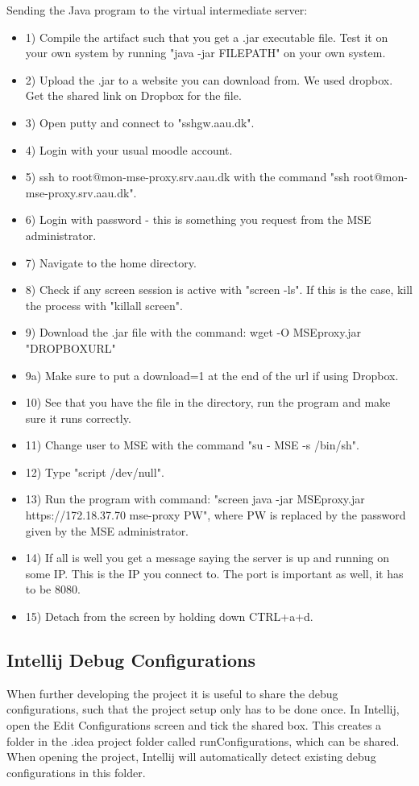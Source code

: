 Sending the Java program to the virtual intermediate server:
\begin{itemize}
\item 1) Compile the artifact such that you get a .jar executable file. Test it on your own system by running "java -jar FILEPATH" on your own system.
\item 2) Upload the .jar to a website you can download from. We used dropbox. Get the shared link on Dropbox for the file.
\item 3) Open putty and connect to "sshgw.aau.dk".
\item 4) Login with your usual moodle account.
\item 5) ssh to root@mon-mse-proxy.srv.aau.dk with the command "ssh root@mon-mse-proxy.srv.aau.dk".
\item 6) Login with password - this is something you request from the MSE administrator.
\item 7) Navigate to the home directory.
\item 8) Check if any screen session is active with "screen -ls". If this is the case, kill the process with "killall screen".
\item 9) Download the .jar file with the command: wget -O MSEproxy.jar "DROPBOXURL" 
\item 9a) Make sure to put a download=1 at the end of the url if using Dropbox.
\item 10) See that you have the file in the directory, run the program and make sure it runs correctly.
\item 11) Change user to MSE with the command "su - MSE -s /bin/sh".
\item 12) Type "script /dev/null".
\item 13) Run the program with command: "screen java -jar MSEproxy.jar https://172.18.37.70 mse-proxy PW", where PW is replaced by the password given by the MSE administrator.
\item 14) If all is well you get a message saying the server is up and running on some IP. This is the IP you connect to. The port is important as well, it has to be 8080.
\item 15) Detach from the screen by holding down CTRL+a+d.
\end{itemize}

\subsection*{Intellij Debug Configurations}
When further developing the project it is useful to share the debug configurations, such that the project setup only has to be done once. In Intellij, open the Edit Configurations screen and tick the shared box. This creates a folder in the .idea project folder called runConfigurations, which can be shared. When opening the project, Intellij will automatically detect existing debug configurations in this folder.

